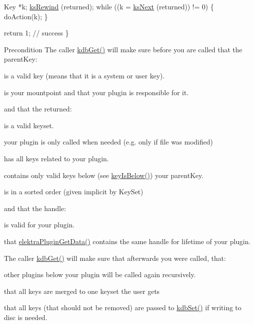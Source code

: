 \begin{DoxyCodeInclude}
        Key *k;
        \hyperlink{group__keyset_gabe793ff51f1728e3429c84a8a9086b70}{ksRewind} (returned);
        \textcolor{keywordflow}{while} ((k = \hyperlink{group__keyset_ga317321c9065b5a4b3e33fe1c399bcec9}{ksNext} (returned)) != 0)
        \{
                doAction(k);
        \}

        \textcolor{keywordflow}{return} 1; \textcolor{comment}{// success}
\}
\end{DoxyCodeInclude}


\begin{DoxyPrecond}{Precondition}
The caller \hyperlink{group__kdb_ga28e385fd9cb7ccfe0b2f1ed2f62453a1}{kdb\+Get()} will make sure before you are called that the parent\+Key\+:
\begin{DoxyItemize}
\item is a valid key (means that it is a system or user key).
\item is your mountpoint and that your plugin is responsible for it. 
\end{DoxyItemize}

and that the returned\+:
\begin{DoxyItemize}
\item is a valid keyset.
\item your plugin is only called when needed (e.\+g. only if file was modified)
\item has {\ttfamily all} keys related to your plugin.
\item contains only valid keys below (see \hyperlink{group__keytest_ga03332b5d97c76a4fd2640aca4762b8df}{key\+Is\+Below()}) your parent\+Key.
\item is in a sorted order (given implicit by Key\+Set) 
\end{DoxyItemize}

and that the handle\+:
\begin{DoxyItemize}
\item is valid for your plugin.
\item that \hyperlink{group__plugin_gaafcf3216b46292f222b8cc7828b4dd20}{elektra\+Plugin\+Get\+Data()} contains the same handle for lifetime of your plugin.
\end{DoxyItemize}

The caller \hyperlink{group__kdb_ga28e385fd9cb7ccfe0b2f1ed2f62453a1}{kdb\+Get()} will make sure that afterwards you were called, that\+:
\begin{DoxyItemize}
\item other plugins below your plugin will be called again recursively.
\item that all keys are merged to one keyset the user gets
\item that all keys (that should not be removed) are passed to \hyperlink{group__kdb_ga11436b058408f83d303ca5e996832bcf}{kdb\+Set()} if writing to disc is needed.
\end{DoxyItemize}
\end{DoxyPrecond}
